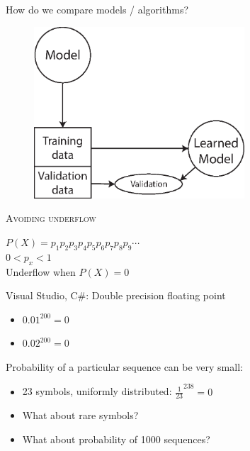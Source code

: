 \begin{frame}
\center
How do we compare models / algorithms?
\begin{figure}
\includegraphics[width=0.7\textwidth]{images/validationdata.eps}
\end{figure}
\end{frame}

\begin{frame}
\center \huge \scshape Avoiding underflow
\end{frame}

\begin{frame}
\center
$P(X) = p_1p_2p_3p_4p_5p_6p_7p_8p_9\cdots$\\
\vspace{20pt}
$0 < p_x < 1$\\
\vspace{20pt}
Underflow when $P(X) = 0$

\end{frame}

\begin{frame}
Visual Studio, C\#: Double precision floating point
\begin{itemize}
\item $0.01^{200} = 0$
\item $0.02^{200} = 0$
\end{itemize}
Probability of a particular sequence can be very small:
\begin{itemize}
\item 23 symbols, uniformly distributed: $\frac{1}{23}^{238} = 0$
\item What about rare symbols?
\item What about probability of 1000 sequences?
\end{itemize}
\end{frame}

